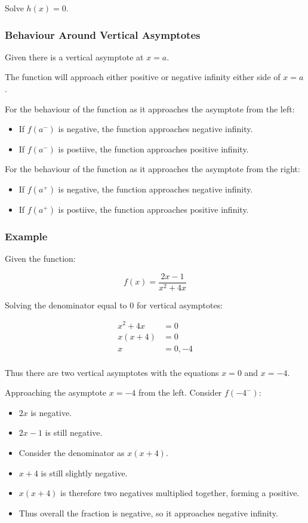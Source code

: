 \documentclass[a4paper,11pt]{report}
\begin{document}
Solve $h(x) = 0$.

\subsubsection{Behaviour Around Vertical Asymptotes}

Given there is a vertical asymptote at $x = a$.

The function will approach either positive or negative infinity either side of
$x = a$.

For the behaviour of the function as it approaches the asymptote from the left:

\begin{itemize}
\item If $f(a^-)$ is negative, the function approaches negative infinity.
\item If $f(a^-)$ is postiive, the function approaches positive infinity.
\end{itemize}

For the behaviour of the function as it approaches the asymptote from the right:

\begin{itemize}
\item If $f(a^+)$ is negative, the function approaches negative infinity.
\item If $f(a^+)$ is postiive, the function approaches positive infinity.
\end{itemize}

\subsubsection{Example}

Given the function:

$$
f(x) = \frac{2x - 1}{x^2 + 4x}
$$

Solving the denominator equal to 0 for vertical asymptotes:

$$
\begin{aligned}
x^2 + 4x & = 0 \\
x(x + 4) & = 0 \\
x & = 0, -4 \\
\end{aligned}
$$

Thus there are two vertical asymptotes with the equations $x = 0$ and $x = -4$.

Approaching the asymptote $x = -4$ from the left. Consider $f(-4^-)$:

\begin{itemize}
\item $2x$ is negative.
\item $2x - 1$ is still negative.
\item Consider the denominator as $x(x + 4)$.
\item $x + 4$ is still slightly negative.
\item $x(x + 4)$ is therefore two negatives multiplied together, forming a
	positive.
\item Thus overall the fraction is negative, so it approaches negative infinity.
\end{itemize}
\end{document}
